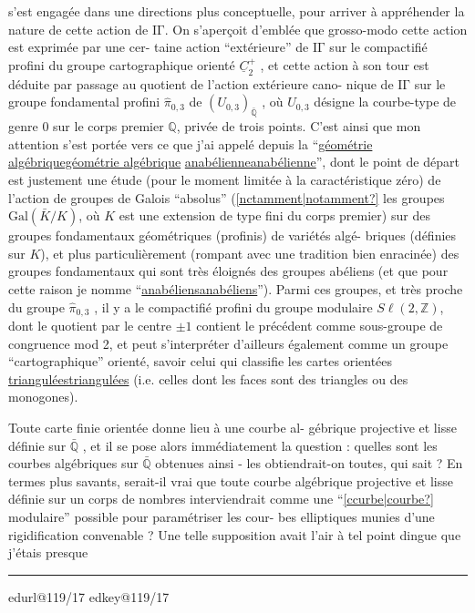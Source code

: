 \documentclass[11pt,a4paper]{article}
\makeatletter
\newif\ifreading
\newif\ifenglish
\def\CurrentScanURL{}
\def\CurrentPageKey{}
\def\CurrentApparatus{}
\newcommand{\scanpage}[1]{%
  \clearpage
  \expandafter\let\expandafter\CurrentScanURL\csname edurl@#1\endcsname
  \expandafter\let\expandafter\CurrentPageKey\csname edkey@#1\endcsname
  \def\CurrentApparatus{}%
  \hypertarget{scan-\CurrentPageKey}{}%
  \typeout{EDITION-SCAN: \CurrentPageKey; PDFPAGE: \the\numexpr\ReadonlyShipoutCounter+1\relax}%
  \ifreading
    \marginnote{\raggedright\scriptsize\sffamily\href{\CurrentScanURL}{119 / \csname edpage@#1\endcsname}}%
  \else
    \noindent{\small\sffamily\href{\CurrentScanURL}{[scan #1]}}\par\smallskip
  \fi}
\newcommand{\mspage}[1]{%
  \ifreading\marginnote{\raggedright\scriptsize\sffamily p.\,#1}[2\baselineskip]%
  \else\noindent{\small\sffamily[p.\,#1]}\par\smallskip\fi}
\let\TextUline\uline
\renewcommand{\uline}[1]{\ifmmode\underline{#1}\else\TextUline{#1}\fi}
\newcommand{\unsure}[1]{\href{\CurrentScanURL}{[#1?]}}
\newcommand{\margin}[1]{%
  \sbox{\MarginalTestBox}{\parbox{\marginparwidth}{\raggedright\footnotesize#1}}%
  \ifdim\dimexpr\ht\MarginalTestBox+\dp\MarginalTestBox\relax>3\baselineskip
    \par\smallskip\noindent\begin{minipage}{\linewidth}\hrule\smallskip
    {\footnotesize\textcolor{HandInk}{\ifenglish Marginal note:\else Note marginale :\fi\ #1}}\smallskip\hrule\end{minipage}\par\smallskip
  \else
    \marginnote{\raggedright\footnotesize\textcolor{HandInk}{#1}}%
  \fi}
\newcommand{\finishscan}{\ifx\CurrentApparatus\empty\else\par\bigskip\noindent\rule{.35\linewidth}{.35pt}\par\smallskip{\footnotesize\setlength{\parskip}{3pt}\CurrentApparatus}\fi}
\makeatother
\begin{document}
s'est engagée dans une directions plus conceptuelle, pour arriver
à appréhender la nature de cette action de $\mathrm{I\!\Gamma}$. On s'aperçoit
d'emblée que grosso-modo cette action est exprimée par une cer-%
taine action ``extérieure'' de $\mathrm{I\!\Gamma}$ sur le compactifié profini du
groupe cartographique orienté $\underline{C}_2^{+}$ , et cette action à son tour
est déduite par passage au quotient de l'action extérieure cano-%
nique de $\mathrm{I\!\Gamma}$ sur le groupe fondamental profini $\hat{\pi}_{0,3}$ de $(U_{0,3})_{\bar{\mathbb{Q}}}$ ,
où $U_{0,3}$ désigne la courbe-type de genre $0$ sur le corps premier
$\mathbb{Q}$, privée de trois points. C'est ainsi que mon attention s'est
portée vers ce que j'ai appelé depuis la ``\uline{géométrie algébrique}
\uline{anabélienne}'', dont le point de départ est justement une étude
(pour le moment limitée à la caractéristique zéro) de l'action
de groupes de Galois ``absolus'' (\unsure{nctamment|notamment} les groupes $\mathrm{Gal}(\bar{K}/K)$,
où $K$ est une extension de type fini du corps premier) sur des
groupes fondamentaux géométriques (profinis) de variétés algé-%
briques (définies sur $K$), et plus particulièrement (rompant avec
une tradition bien enracinée) des groupes fondamentaux qui sont
très éloignés des groupes abéliens (et que pour cette raison je
nomme ``\uline{anabéliens}''). Parmi ces groupes, et très proche du groupe
$\hat{\pi}_{0,3}$ , il y a le compactifié profini du groupe modulaire $S\ell(2,\mathbb{Z})$,
dont le quotient par le centre $\pm 1$ contient le précédent comme
sous-groupe de congruence mod 2, et peut s'interpréter d'ailleurs
également comme un groupe ``cartographique'' orienté, savoir celui
qui classifie les cartes orientées \uline{triangulées} (i.e. celles dont
les faces sont des triangles ou des monogones).

Toute carte finie orientée donne lieu à une courbe al-%
gébrique projective et lisse définie sur $\bar{\mathbb{Q}}$ , et il se pose alors
immédiatement la question : quelles sont les courbes algébriques
sur $\bar{\mathbb{Q}}$ obtenues ainsi - les obtiendrait-on toutes, qui sait ?
En termes plus savants, serait-il vrai que toute courbe algébrique
projective et lisse définie sur un corps de nombres interviendrait
comme une ``\unsure{ccurbe|courbe} modulaire'' possible pour paramétriser les cour-%
bes elliptiques munies d'une rigidification convenable ? Une telle
supposition avait l'air à tel point dingue que j'étais presque

\margin{16}

\finishscan
\scanpage{119/17}
\mspage{15}
\end{document}
